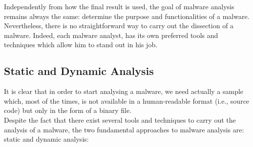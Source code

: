 \documentclass[LaM,binding=0.6cm]{sapthesis}
\begin{document}
Independently from how the final result is used, the goal of malware analysis remains always the same: determine the purpose and functionalities of a malware. Nevertheless, there is no straightforward way to carry out the dissection of a malware. Indeed, each malware analyst, has its own preferred tools and techniques which allow him to stand out in his job.

\subsection{Static and Dynamic Analysis}
It is clear that in order to start analysing a malware, we need actually a sample which, most of the times, is not available in a human-readable format (i.e., source code) but only in the form of a binary file.\\ 
Despite the fact that there exist several tools and techniques to carry out the analysis of a malware, the two fundamental approaches to malware analysis are: static and dynamic analysis: 
\end{document}
